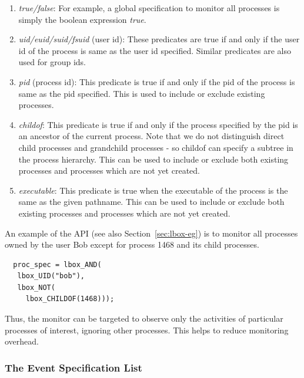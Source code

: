 \begin{enumerate}

\item {\em true/false}:
For example, a global specification to monitor all
processes is simply the boolean expression {\em true}.

\item {\em uid/euid/suid/fsuid} (user id):
These predicates are true if and only if the
user id of the process is same as the user id specified.
Similar predicates are also used for group ids.

\item {\em pid} (process id):
This predicate is true if and only if the pid of the process
is same as the pid specified.
This is used to include or exclude existing processes.

\item {\em childof}:
This predicate is true if and only if the process specified by the pid
is an ancestor of the current process.
Note that we do not distinguish direct child processes
and grandchild processes - so childof can specify a subtree in the
process hierarchy.
This can be used to include or exclude both existing processes and processes
which are not yet created.

\item {\em executable}:
This predicate is true 
when the executable of the process is the same as the given pathname.
This can be used to include or exclude both existing processes and processes
which are not yet created.

\end{enumerate}

\noindent
An example of the API (see also Section~\ref{sec:lbox-eg}) is to monitor
all processes owned by the user Bob
except for process 1468 and its child processes.
{\small
\begin{verbatim}
  proc_spec = lbox_AND(
   lbox_UID("bob"),
   lbox_NOT(
     lbox_CHILDOF(1468)));
\end{verbatim}
}
Thus, the monitor can be targeted to observe only the activities
of particular processes of interest, ignoring other processes. 
This helps to reduce monitoring overhead.

\subsubsection{The Event Specification List}


